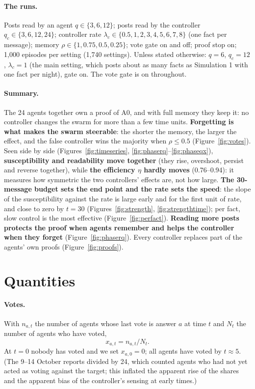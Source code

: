 \documentclass[10pt,a4paper]{article}
\begin{document}
\paragraph{The runs.} Posts read by an agent $q \in \{3, 6, 12\}$; posts read by the controller
$q_c \in \{3, 6, 12, 24\}$; controller rate $\lambda_c \in \{0.5, 1, 2, 3, 4, 5, 6, 7, 8\}$ (one fact per
message); memory $\rho \in \{1, 0.75, 0.5, 0.25\}$; vote gate on and off; proof stop on; 1{,}000 episodes per
setting (1{,}740 settings). Unless stated otherwise: $q = 6$, $q_c = 12$, $\lambda_c = 1$ (the main setting,
which posts about as many facts as Simulation 1 with one fact per night), gate on. The vote gate is on throughout.

\paragraph{Summary.} The 24 agents together own a proof of A0, and with full memory they keep it: no controller
changes the swarm for more than a few time units. \textbf{Forgetting is what makes the swarm steerable}: the
shorter the memory, the larger the effect, and the false controller wins the majority when $\rho \le 0.5$
(Figure~\ref{fig:votes}). Seen side by side (Figures~\ref{fig:timeseries}, \ref{fig:phaserq}--\ref{fig:phaseqx}),
\textbf{susceptibility and readability move together} (they rise, overshoot, persist and reverse together), while
\textbf{the efficiency $\eta$ hardly moves} (0.76--0.94): it measures how symmetric the two controllers' effects are,
not how large. \textbf{The 30-message budget sets the end point and the rate sets the speed}: the slope of the
susceptibility against the rate is large early and for the first unit of rate, and close to zero by $t = 30$
(Figures~\ref{fig:strength}, \ref{fig:strengthtime}); per fact, slow control is the most effective
(Figure~\ref{fig:perfact}). \textbf{Reading more posts protects the proof when agents remember and helps the
controller when they forget} (Figure~\ref{fig:phaserq}). Every controller replaces part of the agents' own proofs
(Figure~\ref{fig:proofs}).

\section{Quantities}\label{sec:quantities}

\paragraph{Votes.} With $n_{a,t}$ the number of agents whose last vote is answer $a$ at time $t$ and $N_t$ the
number of agents who have voted,
\begin{equation}\label{eq:share}
x_{a,t} = n_{a,t}/N_t .
\end{equation}
At $t = 0$ nobody has voted and we set $x_{a,0} = 0$; all agents have voted by $t \approx 5$. (The 9--14 October reports divided by 24, which counted agents who had
not yet acted as voting against the target; this inflated the apparent rise of the shares and the apparent bias of
the controller's sensing at early times.)
\end{document}
